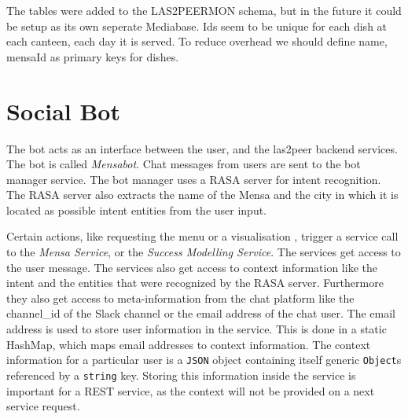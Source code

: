 The tables were added to the LAS2PEERMON schema, but in the future it could be setup as its own seperate Mediabase.
Ids seem to be unique for each dish at each canteen, each day it is served. To reduce overhead we should define name, mensaId as primary keys for dishes.


\section{Social Bot}

The bot acts as an interface between the user, and the las2peer backend services. The bot is called \emph{Mensabot}.
Chat messages from users are sent to the bot manager service. 
The bot manager uses a RASA server for intent recognition. 
The RASA server also extracts the name of the Mensa and the city in which it is located as possible intent entities from the user input.

Certain actions, like requesting the menu or a visualisation , trigger a service call to the \emph{Mensa Service}, or the \emph{Success Modelling Service}.
The services get access to the user message.  
The services also get access to context information like the intent and the entities that were recognized by the RASA server.
Furthermore they also get access to meta-information from the chat platform like the channel\_id of the Slack channel or the email address of the chat user. 
The email address is used to store user information in the service. This is done in a static HashMap, which maps email addresses to context information. The context information for a particular user is a \texttt{JSON} object containing itself generic \texttt{Object}s referenced by a \texttt{string} key. 
Storing this information inside the service is important for a REST service, as the context will not be provided on a next service request.

